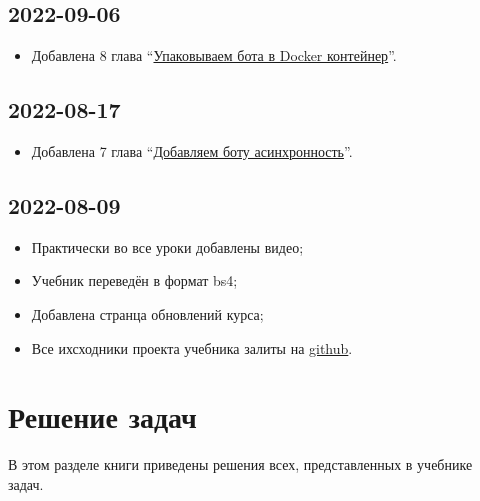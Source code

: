 \documentclass[
]{book}
\providecommand{\tightlist}{%
  \setlength{\itemsep}{0pt}\setlength{\parskip}{0pt}}
\begin{document}
\section*{2022-09-06}\label{section-5}

\begin{itemize}
\tightlist
\item
  Добавлена 8 глава ``\hyperref[ux443ux43fux430ux43aux43eux432ux44bux432ux430ux435ux43c-ux431ux43eux442ux430-ux432-docker-ux43aux43eux43dux442ux435ux439ux43dux435ux440]{Упаковываем бота в Docker контейнер}''.
\end{itemize}

\section*{2022-08-17}\label{section-6}

\begin{itemize}
\tightlist
\item
  Добавлена 7 глава ``\hyperref[ux434ux43eux431ux430ux432ux43bux44fux435ux43c-ux431ux43eux442ux443-ux430ux441ux438ux43dux445ux440ux43eux43dux43dux43eux441ux442ux44c]{Добавляем боту асинхронность}''.
\end{itemize}

\section*{2022-08-09}\label{section-7}

\begin{itemize}
\tightlist
\item
  Практически во все уроки добавлены видео;
\item
  Учебник переведён в формат bs4;
\item
  Добавлена странца обновлений курса;
\item
  Все ихсходники проекта учебника залиты на \href{https://github.com/selesnow/build_telegram_bot_using_r}{github}.
\end{itemize}

\chapter*{Решение задач}\label{ux440ux435ux448ux435ux43dux438ux435-ux437ux430ux434ux430ux447}

В этом разделе книги приведены решения всех, представленных в учебнике задач.
\end{document}
